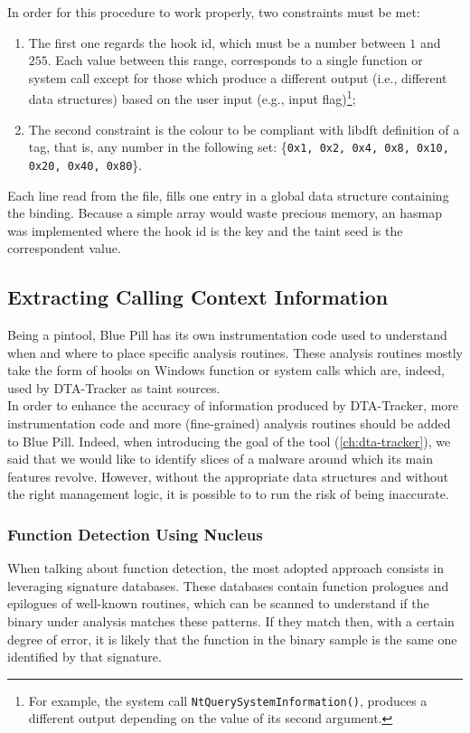 \documentclass[LaM,binding=0.6cm]{sapthesis}
\begin{document}
In order for this procedure to work properly, two constraints must be met:
\begin{enumerate}
\item The first one regards the hook id, which must be a number between $1$ and $255$. Each value between this range, corresponds to a single function or system call except for those which produce a different output (i.e., different data structures) based on the user input (e.g., input flag)\footnote{For example, the system call \texttt{NtQuerySystemInformation()}, produces a different output depending on the value of its second argument.};
\item The second constraint is the colour to be compliant with libdft definition of a tag, that is, any number in the following set: \{\texttt{0x1, 0x2, 0x4, 0x8, 0x10, 0x20, 0x40, 0x80}\}.
\end{enumerate}
Each line read from the file, fills one entry in a global data structure containing the binding. Because a simple array would waste precious memory, an hasmap was implemented where the hook id is the key and the taint seed is the correspondent value.

\subsection{Extracting Calling Context Information}
Being a pintool, Blue Pill has its own instrumentation code used to understand when and where to place specific analysis routines. These analysis routines mostly take the form of hooks on Windows function or system calls which are, indeed, used by DTA-Tracker as taint sources.\\

In order to enhance the accuracy of information produced by DTA-Tracker, more instrumentation code and more (fine-grained) analysis routines should be added to Blue Pill. Indeed, when introducing the goal of the tool (\autoref{ch:dta-tracker}), we said that we would like to identify slices of a malware around which its main features revolve. However, without the appropriate data structures and without the right management logic, it is possible to to run the risk of being inaccurate.

\subsubsection{Function Detection Using Nucleus~\cite{andriesse2017compiler}}
When talking about function detection, the most adopted approach consists in leveraging signature databases. These databases contain function prologues and epilogues of well-known routines, which can be scanned to understand if the binary under analysis matches these patterns. If they match then, with a certain degree of error, it is likely that the function in the binary sample is the same one identified by that signature.
\end{document}
